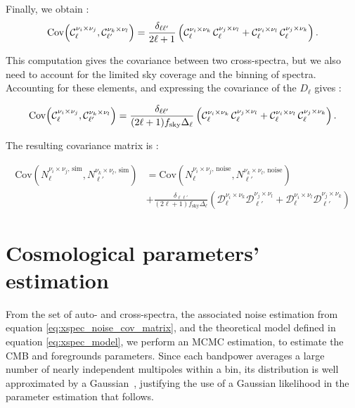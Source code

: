\documentclass[../../thesis.tex]{subfiles}
\begin{document}
Finally, we obtain : 
\begin{equation}
    \mathrm{Cov}\!\left(\mathcal{C}_{\ell}^{\nu_{i} \times \nu_{j}}, \mathcal{C}_{\ell'}^{\nu_{k} \times \nu_{l}}\right) = \frac{\delta_{\ell\ell'}}{2\ell+1} \left( \mathcal{C}_{\ell}^{\nu_{i} \times \nu_{k}}\,\mathcal{C}_{\ell}^{\nu_{j} \times \nu_{l}} + \mathcal{C}_{\ell}^{\nu_{i} \times \nu_{l}}\,\mathcal{C}_{\ell}^{\nu_{j} \times \nu_{k}} \right).
\end{equation}

This computation gives the covariance between two cross-spectra, but we also need to account for the limited sky coverage and the binning of spectra. Accounting for these elements, and expressing the covariance of the $D_\ell$ gives : 

\begin{equation}
    \mathrm{Cov}\!\left(\mathcal{C}_{\ell}^{\nu_{i} \times \nu_{j}}, \mathcal{C}_{\ell'}^{\nu_{k} \times \nu_{l}}\right) = \frac{\delta_{\ell\ell'}}{(2\ell+1)f_\text{sky}\Delta_\ell} \left( \mathcal{C}_{\ell}^{\nu_{i} \times \nu_{k}}\,\mathcal{C}_{\ell}^{\nu_{j} \times \nu_{l}} + \mathcal{C}_{\ell}^{\nu_{i} \times \nu_{l}}\,\mathcal{C}_{\ell}^{\nu_{j} \times \nu_{k}} \right).
\end{equation}

The resulting covariance matrix is : 

\begin{equation}
    \boxed{
    \begin{aligned}
        \text{Cov}\left(N_{\ell}^{\nu_i \times \nu_j,\,\text{sim}}, N_{\ell'}^{\nu_k \times \nu_l,\,\text{sim}}\right) &= \text{Cov}\left(N_{\ell}^{\nu_i \times \nu_j,\,\text{noise}}, N_{\ell'}^{\nu_k \times \nu_l,\,\text{noise}}\right) \\
        &+ \frac{\delta_{\ell \ell'}}{\left( 2 \ell + 1\right) f_{\text{sky}} \Delta_\ell} \left( \mathcal{D}_{\ell}^{\nu_i \times \nu_k} \mathcal{D}_{\ell'}^{\nu_j \times \nu_l} + \mathcal{D}_{\ell}^{\nu_i \times \nu_l} \mathcal{D}_{\ell'}^{\nu_j \times \nu_k} \right)
    \end{aligned}
    }
    \label{eq:xspec_noise_cov_matrix}
\end{equation}

\section{Cosmological parameters' estimation}


From the set of auto- and cross-spectra, the associated noise estimation from equation \ref{eq:xspec_noise_cov_matrix}, and the theoretical model defined in equation \ref{eq:xspec_model}, we perform an MCMC estimation, to estimate the CMB and foregrounds parameters. Since each bandpower averages a large number of nearly independent multipoles within a bin, its distribution is well approximated by a Gaussian~\cite{hamimeche2008}, justifying the use of a Gaussian likelihood in the parameter estimation that follows.\\
\end{document}
